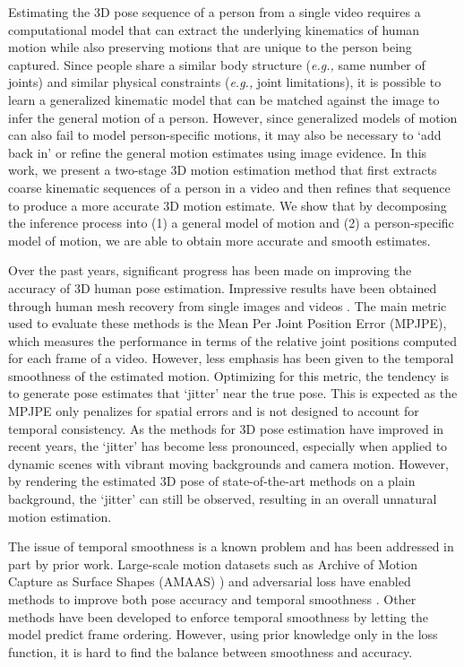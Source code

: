 \documentclass[runningheads]{llncs}
\begin{document}
Estimating the 3D pose sequence of a person from a single video requires a computational model that can extract the underlying kinematics of human motion while also preserving motions that are unique to the person being captured. Since people share a similar body structure (\emph{e.g.,} same number of joints) and similar physical constraints (\emph{e.g.,} joint limitations), it is possible to learn a generalized kinematic model that can be matched against the image to infer the general motion of a person. However, since generalized models of motion can also fail to model person-specific motions, it may also be necessary to `add back in' or refine the general motion estimates using image evidence. In this work, we present a two-stage 3D motion estimation method that first extracts coarse kinematic sequences of a person in a video and then refines that sequence to produce a more accurate 3D motion estimate. We show that by decomposing the inference process into (1) a general model of motion and (2) a person-specific model of motion, we are able to obtain more accurate and smooth estimates.

Over the past years, significant progress has been made on improving the accuracy of 3D human pose estimation. Impressive results have been obtained through human mesh recovery from single images  \cite{1908.07172,spin,Georgakis,DensePose,DenseRaC} and videos \cite{hmmr,vibe,hmr,Hossain2018}. The main metric used to evaluate these methods is the Mean Per Joint Position Error (MPJPE), which measures the performance in terms of the relative joint positions computed for each frame of a video. However, less emphasis has been given to the temporal smoothness of the estimated motion. Optimizing for this metric, the tendency is to generate pose estimates that `jitter' near the true pose. This is expected as the MPJPE only penalizes for spatial errors and is not designed to account for temporal consistency. As the methods for 3D pose estimation have improved in recent years, the `jitter' has become less pronounced, especially when applied to dynamic scenes with vibrant moving backgrounds and camera motion. However, by rendering the estimated 3D pose of state-of-the-art methods on a plain background, the `jitter' can still be observed, resulting in an overall unnatural motion estimation. 

The issue of temporal smoothness is a known problem and has been addressed in part by prior work. Large-scale motion datasets such as Archive of Motion Capture as Surface Shapes (AMAAS) \cite{amass}) and adversarial loss have enabled methods to improve both pose accuracy and temporal smoothness \cite{vibe,hmmr}. Other methods have been developed to enforce temporal smoothness \cite{1908.07172} by letting the model predict frame ordering. However, using prior knowledge only in the loss function, it is hard to find the balance between smoothness and accuracy. 
\end{document}
